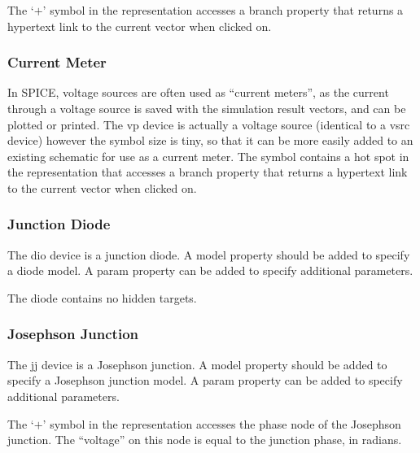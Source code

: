 The `$+$' symbol in the representation accesses a {\et branch}
property that returns a hypertext link to the current vector when
clicked on.

\subsubsection{Current Meter}

In SPICE, voltage sources are often used as ``current meters'', as the
current through a voltage source is saved with the simulation result
vectors, and can be plotted or printed.  The {\et vp} device is
actually a voltage source (identical to a {\vt vsrc} device) however
the symbol size is tiny, so that it can be more easily added to an
existing schematic for use as a current meter.  The symbol contains a
hot spot in the representation that accesses a {\et branch} property
that returns a hypertext link to the current vector when clicked on.

\subsubsection{Junction Diode}

The {\et dio} device is a junction diode.  A {\et model} property
should be added to specify a diode model.  A {\et param} property can
be added to specify additional parameters.

The diode contains no hidden targets.

\subsubsection{Josephson Junction}

The {\et jj} device is a Josephson junction.  A {\et model} property
should be added to specify a Josephson junction model.  A {\et param}
property can be added to specify additional parameters.

The `$+$' symbol in the representation accesses the phase node of the
Josephson junction.  The ``voltage'' on this node is equal to the
junction phase, in radians.

